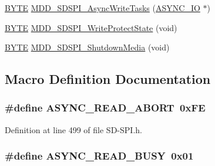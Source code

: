 \begin{DoxyCompactItemize}
\item 
\hyperlink{_generic_type_defs_8h_a4ae1dab0fb4b072a66584546209e7d58}{B\+Y\+T\+E} \hyperlink{_s_d-_s_p_i_8h_a016239efa906aebb0d5eea2d19caf22b}{M\+D\+D\+\_\+\+S\+D\+S\+P\+I\+\_\+\+Async\+Write\+Tasks} (\hyperlink{struct_a_s_y_n_c___i_o}{A\+S\+Y\+N\+C\+\_\+\+I\+O} $\ast$)
\item 
\hyperlink{_generic_type_defs_8h_a4ae1dab0fb4b072a66584546209e7d58}{B\+Y\+T\+E} \hyperlink{_s_d-_s_p_i_8h_a27a3238b87bb45f8d37c958982ace55e}{M\+D\+D\+\_\+\+S\+D\+S\+P\+I\+\_\+\+Write\+Protect\+State} (void)
\item 
\hyperlink{_generic_type_defs_8h_a4ae1dab0fb4b072a66584546209e7d58}{B\+Y\+T\+E} \hyperlink{_s_d-_s_p_i_8h_a8f03681bf00e9f6d8f31581f55ad7c1d}{M\+D\+D\+\_\+\+S\+D\+S\+P\+I\+\_\+\+Shutdown\+Media} (void)
\end{DoxyCompactItemize}


\subsection{Macro Definition Documentation}
\hypertarget{_s_d-_s_p_i_8h_a685aa61458c505ded19bf16ff0f82e59}{}
\subsubsection[{A\+S\+Y\+N\+C\+\_\+\+R\+E\+A\+D\+\_\+\+A\+B\+O\+R\+T}]{\setlength{\rightskip}{0pt plus 5cm}\#define A\+S\+Y\+N\+C\+\_\+\+R\+E\+A\+D\+\_\+\+A\+B\+O\+R\+T~0x\+F\+E}\label{_s_d-_s_p_i_8h_a685aa61458c505ded19bf16ff0f82e59}


Definition at line 499 of file S\+D-\/\+S\+P\+I.\+h.

\hypertarget{_s_d-_s_p_i_8h_a56aa0c31ca1851292de52c023359f887}{}
\subsubsection[{A\+S\+Y\+N\+C\+\_\+\+R\+E\+A\+D\+\_\+\+B\+U\+S\+Y}]{\setlength{\rightskip}{0pt plus 5cm}\#define A\+S\+Y\+N\+C\+\_\+\+R\+E\+A\+D\+\_\+\+B\+U\+S\+Y~0x01}\label{_s_d-_s_p_i_8h_a56aa0c31ca1851292de52c023359f887}


